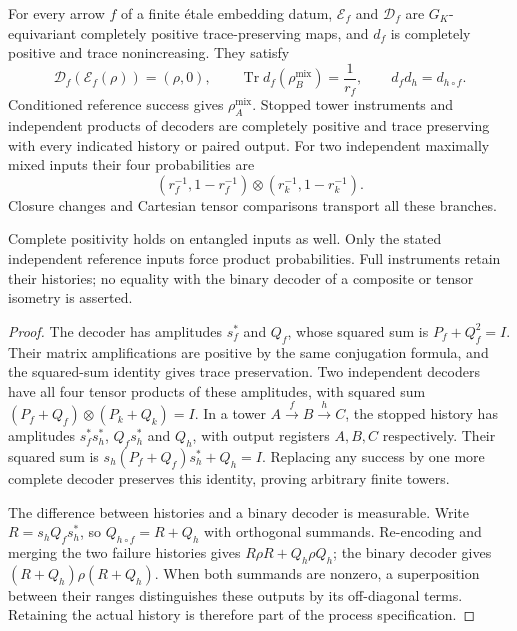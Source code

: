 \begin{theorem}
\statusProved\quad
For every arrow $f$ of a finite \'etale embedding datum, $\mathcal E_f$
and $\mathcal D_f$ are $G_K$-equivariant completely positive
trace-preserving maps, and $d_f$ is completely positive and trace
nonincreasing. They satisfy
\[
 \mathcal D_f(\mathcal E_f(\rho))=(\rho,0),\qquad
 \operatorname{Tr}d_f(\rho_B^{\mathrm{mix}})=\frac1{r_f},\qquad
 d_f d_h=d_{h\circ f}.
\]
Conditioned reference success gives $\rho_A^{\mathrm{mix}}$.
Stopped tower instruments and independent products of decoders are
completely positive and trace preserving with every indicated history or
paired output. For two independent maximally mixed inputs their four
probabilities are
\[
 (r_f^{-1},1-r_f^{-1})\otimes(r_k^{-1},1-r_k^{-1}).
\]
Closure changes and Cartesian tensor comparisons transport all these branches.
\end{theorem}
\begin{scope}
Complete positivity holds on entangled inputs as well. Only the stated
independent reference inputs force product probabilities. Full instruments
retain their histories; no equality with the binary decoder of a composite
or tensor isometry is asserted.
\end{scope}

\begin{proof}
The decoder has amplitudes $s_f^*$ and $Q_f$, whose squared sum is
$P_f+Q_f^2=I$. Their matrix amplifications are positive by the same
conjugation formula, and the squared-sum identity gives trace preservation.
Two independent decoders have all four tensor products of these amplitudes,
with squared sum $(P_f+Q_f)\otimes(P_k+Q_k)=I$.
In a tower $A\xrightarrow{f}B\xrightarrow{h}C$, the stopped history has
amplitudes $s_f^*s_h^*$, $Q_fs_h^*$ and $Q_h$, with output registers
$A,B,C$ respectively. Their squared sum is
$s_h(P_f+Q_f)s_h^*+Q_h=I$. Replacing any success by one more complete
decoder preserves this identity, proving arbitrary finite towers.

The difference between histories and a binary decoder is measurable.
Write $R=s_hQ_fs_h^*$, so $Q_{h\circ f}=R+Q_h$ with orthogonal summands.
Re-encoding and merging the two failure histories gives
$R\rho R+Q_h\rho Q_h$; the binary decoder gives
$(R+Q_h)\rho(R+Q_h)$. When both summands are nonzero, a superposition
between their ranges distinguishes these outputs by its off-diagonal terms.
Retaining the actual history is therefore part of the process specification.
\end{proof}

